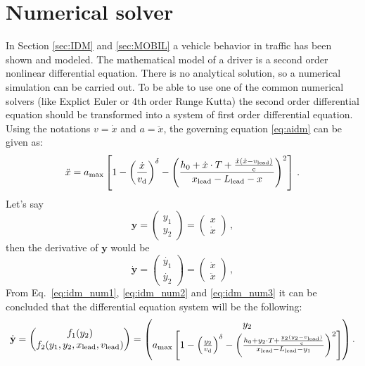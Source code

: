 		\section{Numerical solver}
			In Section \ref{sec:IDM} and \ref{sec:MOBIL} a vehicle behavior in traffic has been shown and modeled. The mathematical model of a driver is a second order nonlinear differential equation. There is no analytical solution, so a numerical simulation can be carried out. To be able to use one of the common numerical solvers (like Explict Euler or 4th order Runge Kutta) the second order differential equation should be transformed into a system of first order differential equation. Using the notations $v=\dot{x}$ and $a=\ddot{x}$, the governing equation \eqref{eq:aidm} can be given as:
			\begin{equation}
				\ddot{x}=a_{\rm max}\left [ 1 - \left ( \frac{\dot{x}}{{v_{\rm d}}} \right )^\delta - \left ( \frac{h_0 + \dot{x}\cdot T + \frac{\dot{x}(\dot{x}-v_{\rm lead})}{{\rm c}}}{x_{\rm lead}-L_{\rm lead} - x} \right )^2 \right ]\,.
				\label{eq:idm_num1}
			\end{equation}
			Let's say
			\begin{equation}
				\textbf{y}=
				\begin{pmatrix}
					y_1\\
					y_2
				\end{pmatrix}
				=
				\begin{pmatrix}
					x\\
					\dot{x}
				\end{pmatrix}\,,
				\label{eq:idm_num2}
			\end{equation}
			then the derivative of $\textbf{y}$ would be
			\begin{equation}
				\dot{\textbf{y}}=
				\begin{pmatrix}
					\dot{y_1}\\
					\dot{y_2}
				\end{pmatrix}
				=
				\begin{pmatrix}
					\dot{x}\\
					\ddot{x}
				\end{pmatrix}\,,
				\label{eq:idm_num3}
			\end{equation}
			From Eq.~\eqref{eq:idm_num1}, \eqref{eq:idm_num2} and \eqref{eq:idm_num3} it can be concluded that the differential equation system will be the following:
			\begin{equation}
				\dot{\textbf{y}}
				=
				\begin{pmatrix}
					f_1(y_2)\\
					f_2(y_1,y_2,x_{\rm lead},v_{\rm lead})\\
				\end{pmatrix}
				=
				\begin{pmatrix}
					y_2\\
					a_{\rm max}\left [ 1 - \left ( \frac{y_2}{{v_{\rm d}}} \right )^{\delta} - \left ( \frac{h_0 + y_2\cdot T + \frac{y_2(y_2-v_{\rm lead})}{{\rm c}}}{x_{\rm lead} - L_{\rm lead} - y_1} \right )^2 \right ]
				\end{pmatrix}.
				\label{eq:numerical_idm}
			\end{equation}